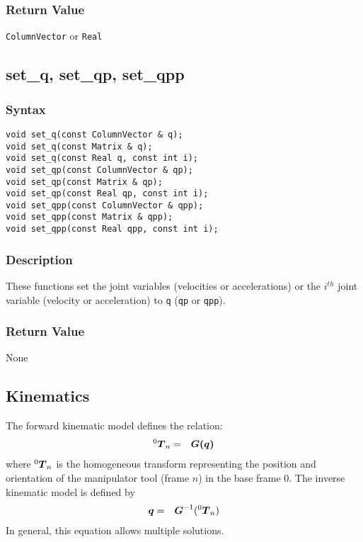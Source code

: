\documentclass[11pt,fleqn,letterpaper]{report}
\newcommand{\mbold}[1]{\mbox{\boldmath $ #1 $}}
\begin{document}
\subsubsection*{Return Value}

{\tt ColumnVector} or {\tt Real}

\newpage

\subsection*{set\_q, set\_qp, set\_qpp}
\subsubsection*{Syntax}
\begin{verbatim}
void set_q(const ColumnVector & q);
void set_q(const Matrix & q);
void set_q(const Real q, const int i);
void set_qp(const ColumnVector & qp);
void set_qp(const Matrix & qp);
void set_qp(const Real qp, const int i);
void set_qpp(const ColumnVector & qpp);
void set_qpp(const Matrix & qpp);
void set_qpp(const Real qpp, const int i);
\end{verbatim}
\subsubsection*{Description}
These functions set the joint variables (velocities or accelerations)
or the $i^{th}$ joint variable (velocity or acceleration) to {\tt q}
(\texttt{qp} or \texttt{qpp}).

\subsubsection*{Return Value}

None

\newpage

\subsection{Kinematics}

The forward kinematic model defines the relation:
\begin{eqnarray}
{}^0 \mbold{T}_n & = & \mbold{G(q)}
\end{eqnarray}
where ${}^0 \mbold{T}_n$ is the homogeneous transform representing the position
and orientation of the manipulator tool (frame $n$) in the base frame $0$.
The inverse kinematic model is defined by
\begin{eqnarray}
\mbold{q} & = & \mbold{G}^{-1}({}^0 \mbold{T}_n)
\end{eqnarray}
In general, this equation allows multiple solutions.
\end{document}
